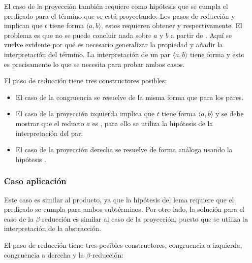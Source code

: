 El caso de la proyección también requiere como hipótesis que se cumpla el predicado para el término que se está proyectando.
Los pasos de reducción  y  implican que $t$ tiene forma $\langle a, b \rangle$, estos requieren obtener \snstar {} y \snstar {} respectivamente.
El problema es que no se puede concluir nada sobre $a$ y $b$ a partir de  .
Aquí se vuelve evidente por qué es necesario generalizar la propiedad  y añadir la interpretación del término.
La interpretación de un par $\langle a, b \rangle$ tiene forma \snstar{}  \snstar{} y esto es precisamente lo que se necesita para probar ambos casos.


El paso de reducción tiene tres constructores posibles:
\begin{itemize}
	\item El caso de la congruencia se resuelve de la misma forma que para los pares.
	\item El caso de la proyección izquierda implica que $t$ tiene forma $\langle a, b \rangle$ y se debe mostrar que el reducto $a$ es \snstar, para ello se utiliza la hipótesis  de la interpretación del par.
	\item El caso de la proyección derecha se resuelve de forma análoga usando la hipótesis .
\end{itemize}


\subsubsection{Caso aplicación}

Este caso es similar al producto, ya que la hipótesis del lema requiere que el predicado se cumpla para ambos subtérminos.
Por otro lado, la solución para el caso de la $\beta$-reducción es similar al caso de la proyección, puesto que se utiliza la interpretación de la abstracción.


El paso de reducción tiene tres posibles constructores, congruencia a izquierda, congruencia a derecha y la $\beta$-reducción:

